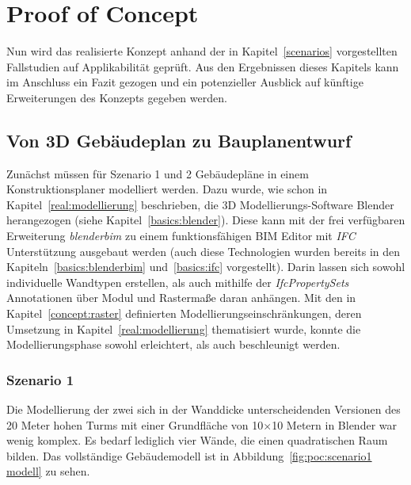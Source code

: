 \chapter{Proof of Concept}
Nun wird das realisierte Konzept anhand der in Kapitel~\ref{scenarios} vorgestellten Fallstudien auf Applikabilität geprüft.
Aus den Ergebnissen dieses Kapitels kann im Anschluss ein Fazit gezogen und ein potenzieller Ausblick auf künftige Erweiterungen des Konzepts gegeben werden.

\section{Von 3D Gebäudeplan zu Bauplanentwurf}
Zunächst müssen für Szenario 1 und 2 Gebäudepläne in einem Konstruktionsplaner modelliert werden.
Dazu wurde, wie schon in Kapitel~\ref{real:modellierung} beschrieben, die 3D Modellierungs-Software Blender herangezogen (siehe Kapitel~\ref{basics:blender}).
Diese kann mit der frei verfügbaren Erweiterung \textit{blenderbim} zu einem funktionsfähigen BIM Editor mit \textit{IFC} Unterstützung ausgebaut werden (auch diese Technologien wurden bereits in den Kapiteln~\ref{basics:blenderbim} und~\ref{basics:ifc} vorgestellt).
Darin lassen sich sowohl individuelle Wandtypen erstellen, als auch mithilfe der \textit{IfcPropertySets} Annotationen über Modul und Rastermaße daran anhängen.
Mit den in Kapitel~\ref{concept:raster} definierten Modellierungseinschränkungen, deren Umsetzung in Kapitel~\ref{real:modellierung} thematisiert wurde, konnte die Modellierungsphase sowohl erleichtert, als auch beschleunigt werden.

\subsection{Szenario 1}\label{poc:scenario1}
Die Modellierung der zwei sich in der Wanddicke unterscheidenden Versionen des 20 Meter hohen Turms mit einer Grundfläche von 10$\times$10 Metern in Blender war wenig komplex.
Es bedarf lediglich vier Wände, die einen quadratischen Raum bilden.
Das vollständige Gebäudemodell ist in Abbildung~\ref{fig:poc:scenario1 modell} zu sehen.

